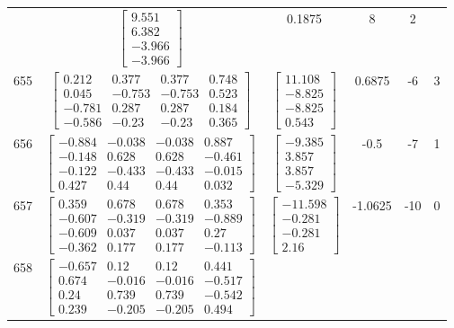 \documentclass[a4paper,12pt]{article}
\begin{document}
\begin{tabular}{c c c c c c}
&
$\begin{bmatrix} 9.551 \\ 6.382 \\ -3.966 \\ -3.966 \end{bmatrix}$
&
0.1875
&
8
&
2
\\
655
&
$\begin{bmatrix} 0.212 & 0.377 & 0.377 & 0.748 \\ 0.045 & -0.753 & -0.753 & 0.523 \\ -0.781 & 0.287 & 0.287 & 0.184 \\ -0.586 & -0.23 & -0.23 & 0.365 \end{bmatrix}$
&
$\begin{bmatrix} 11.108 \\ -8.825 \\ -8.825 \\ 0.543 \end{bmatrix}$
&
0.6875
&
-6
&
3
\\
656
&
$\begin{bmatrix} -0.884 & -0.038 & -0.038 & 0.887 \\ -0.148 & 0.628 & 0.628 & -0.461 \\ -0.122 & -0.433 & -0.433 & -0.015 \\ 0.427 & 0.44 & 0.44 & 0.032 \end{bmatrix}$
&
$\begin{bmatrix} -9.385 \\ 3.857 \\ 3.857 \\ -5.329 \end{bmatrix}$
&
-0.5
&
-7
&
1
\\
657
&
$\begin{bmatrix} 0.359 & 0.678 & 0.678 & 0.353 \\ -0.607 & -0.319 & -0.319 & -0.889 \\ -0.609 & 0.037 & 0.037 & 0.27 \\ -0.362 & 0.177 & 0.177 & -0.113 \end{bmatrix}$
&
$\begin{bmatrix} -11.598 \\ -0.281 \\ -0.281 \\ 2.16 \end{bmatrix}$
&
-1.0625
&
-10
&
0
\\
658
&
$\begin{bmatrix} -0.657 & 0.12 & 0.12 & 0.441 \\ 0.674 & -0.016 & -0.016 & -0.517 \\ 0.24 & 0.739 & 0.739 & -0.542 \\ 0.239 & -0.205 & -0.205 & 0.494 \end{bmatrix}$

\end{tabular}
\end{document}
